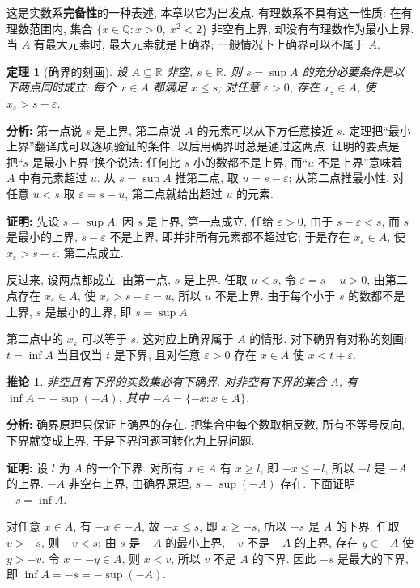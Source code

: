 \documentclass[UTF8,openany]{ctexbook}
\theoremstyle{chinesetextbook}
\newtheorem{theorem}{定理}[section]
\newenvironment{cnproof}{\par\indent\textbf{证明:} \ignorespaces}{\par}
\newtheorem*{corollarysingle}{推论}
\begin{document}
这是实数系\textbf{完备性}的一种表述, 本章以它为出发点. 有理数系不具有这一性质: 在有理数范围内, 集合 $\{x\in\mathbb Q:x>0,\ x^2<2\}$ 非空有上界, 却没有有理数作为最小上界. 当 $A$ 有最大元素时, 最大元素就是上确界; 一般情况下上确界可以不属于 $A$.
\begin{theorem}[确界的刻画]
设 $A\subseteq\mathbb R$ 非空, $s\in\mathbb R$. 则 $s=\sup A$ 的充分必要条件是以下两点同时成立: 每个 $x\in A$ 都满足 $x\le s$; 对任意 $\varepsilon>0$, 存在 $x_\varepsilon\in A$, 使 $x_\varepsilon>s-\varepsilon$.
\end{theorem}
\par\indent\textbf{分析:} 第一点说 $s$ 是上界, 第二点说 $A$ 的元素可以从下方任意接近 $s$. 定理把“最小上界”翻译成可以逐项验证的条件, 以后用确界时总是通过这两点. 证明的要点是把“$s$ 是最小上界”换个说法: 任何比 $s$ 小的数都不是上界, 而“$u$ 不是上界”意味着 $A$ 中有元素超过 $u$. 从 $s=\sup A$ 推第二点, 取 $u=s-\varepsilon$; 从第二点推最小性, 对任意 $u<s$ 取 $\varepsilon=s-u$, 第二点就给出超过 $u$ 的元素.
\begin{cnproof}
先设 $s=\sup A$. 因 $s$ 是上界, 第一点成立. 任给 $\varepsilon>0$, 由于 $s-\varepsilon<s$, 而 $s$ 是最小的上界, $s-\varepsilon$ 不是上界, 即并非所有元素都不超过它; 于是存在 $x_\varepsilon\in A$, 使 $x_\varepsilon>s-\varepsilon$. 第二点成立.

反过来, 设两点都成立. 由第一点, $s$ 是上界. 任取 $u<s$, 令 $\varepsilon=s-u>0$, 由第二点存在 $x_\varepsilon\in A$, 使 $x_\varepsilon>s-\varepsilon=u$, 所以 $u$ 不是上界. 由于每个小于 $s$ 的数都不是上界, $s$ 是最小的上界, 即 $s=\sup A$.
\end{cnproof}
第二点中的 $x_\varepsilon$ 可以等于 $s$, 这对应上确界属于 $A$ 的情形. 对下确界有对称的刻画: $t=\inf A$ 当且仅当 $t$ 是下界, 且对任意 $\varepsilon>0$ 存在 $x\in A$ 使 $x<t+\varepsilon$.
\begin{corollarysingle}
非空且有下界的实数集必有下确界. 对非空有下界的集合 $A$, 有 $\inf A=-\sup(-A)$, 其中 $-A=\{-x:x\in A\}$.
\end{corollarysingle}
\par\indent\textbf{分析:} 确界原理只保证上确界的存在. 把集合中每个数取相反数, 所有不等号反向, 下界就变成上界, 于是下界问题可转化为上界问题.
\begin{cnproof}
设 $l$ 为 $A$ 的一个下界. 对所有 $x\in A$ 有 $x\ge l$, 即 $-x\le-l$, 所以 $-l$ 是 $-A$ 的上界. $-A$ 非空有上界, 由确界原理, $s=\sup(-A)$ 存在. 下面证明 $-s=\inf A$.

对任意 $x\in A$, 有 $-x\in-A$, 故 $-x\le s$, 即 $x\ge-s$, 所以 $-s$ 是 $A$ 的下界. 任取 $v>-s$, 则 $-v<s$; 由 $s$ 是 $-A$ 的最小上界, $-v$ 不是 $-A$ 的上界, 存在 $y\in-A$ 使 $y>-v$. 令 $x=-y\in A$, 则 $x<v$, 所以 $v$ 不是 $A$ 的下界. 因此 $-s$ 是最大的下界, 即 $\inf A=-s=-\sup(-A)$.
\end{cnproof}
\end{document}
